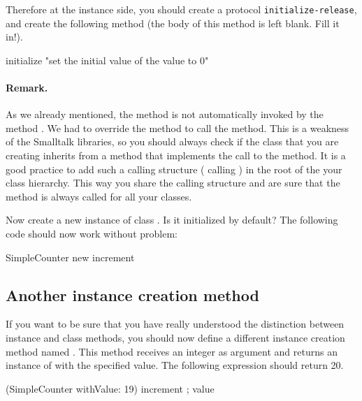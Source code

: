 Therefore at the instance side, you should create a protocol
\texttt{initialize-release}, and create the following method (the body
of this method is left blank. Fill it in!).

\begin{code}
initialize
   "set the initial value of the value to 0"
\end{code}

\paragraph{Remark.} As we already mentioned, the 
method is not automatically invoked by the method .
We had to override the method  to call the
 method. This is a weakness of the Smalltalk
libraries, so you should always check if the class that you are
creating inherits from a  method that implements the
call to the  method. It is a good practice to
add such a calling structure ( calling
) in the root of the your class hierarchy. This
way you share the calling structure and are sure that the
 method is always called for all your classes.

Now create a new instance of class . Is it
initialized by default? The following code should now work without
problem:

\begin{code}
SimpleCounter new increment
\end{code}

\subsection*{Another instance creation method}
If you want to be sure that you have really understood the
distinction between instance and class methods, you should now define
a different instance creation method named .
This method receives an integer as argument and returns an
instance of  with the specified value. The
following expression should return 20.

\begin{code}(SimpleCounter
withValue: 19) increment ; value
\end{code}


